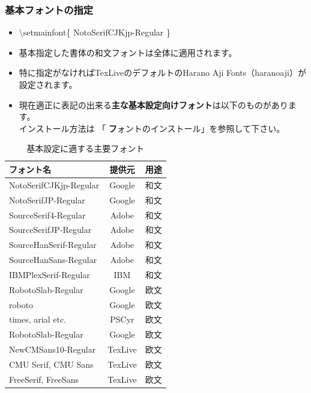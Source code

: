 \documentclass[a4paper,10pt]{ltjsarticle}
\def\colH#1{\color[HTML]{#1}}
\def\bs{\textbackslash }
\def\basefont{NotoSerifCJKjp-Regular}
\begin{document}
\subsubsection{基本フォントの指定}
\begin{itemize}
  \item[]\hspace{-5mm} {\colH{800000}\bs setmainfont\{} \basefont{\colH{800000} \}}
  \item 基本指定した書体の和文フォントは全体に適用されます。
  \item 特に指定がなければTexLiveのデフォルトのHarano Aji Fonts（haranoaji）が設定されます。
  \item 現在適正に表記の出来る\textbf{主な基本設定向けフォント}は以下のものがあります。\\
  インストール方法は 「 {\textbf フォントのインストール}」を参照して下さい。\vspace{-4mm}
\end{itemize}
\begin{table}[h]
\begin{center}
\begin{tabular}{l|c|l}
\textbf{フォント名} & \textbf{提供元} & \textbf{用途}\\
\hline
NotoSerifCJKjp-Regular & Google & 和文\\%
NotoSerifJP-Regular & Google & 和文\\%
SourceSerif4-Regular & Adobe & 和文\\%
SourceSerifJP-Regular & Adobe & 和文\\%
SourceHanSerif-Regular & Adobe & 和文\\%
SourceHanSans-Regular & Adobe & 和文\\%
IBMPlexSerif-Regular & IBM & 和文\\%
RobotoSlab-Regular & Google & 欧文\\%
roboto & Google & 欧文\\%
times, arial etc. & PSCyr & 欧文\\%
RobotoSlab-Regular & Google & 欧文\\%
NewCMSans10-Regular & TexLive & 欧文\\%
CMU Serif, CMU Sans & TexLive & 欧文\\%
FreeSerif, FreeSans & TexLive & 欧文\\%
\end{tabular}
\caption{基本設定に適する主要フォント}
\end{center}
\end{table}
\end{document}
